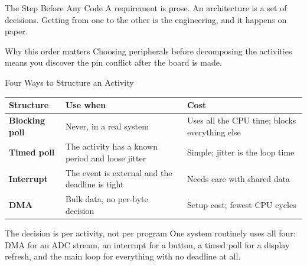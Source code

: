 \documentclass[9pt,aspectratio=169,xcolor=table]{beamer}
\begin{document}
\begin{frame}{The Step Before Any Code}
    \leavevmode
    A requirement is prose. An architecture is a set of decisions. Getting from
    one to the other is \alert{the engineering}, and it happens on paper.

    \vspace{3mm}
    \begin{center}
    \end{center}

    \vspace{2mm}
    \begin{block}{Why this order matters}
        Choosing peripherals before decomposing the activities means you discover
        the pin conflict \alert{after} the board is made.
    \end{block}
\end{frame}

\begin{frame}{Four Ways to Structure an Activity}
    \begin{center}
    {\small
    \striped
    \begin{tabular}{@{}l R{.34\textwidth} R{.32\textwidth}@{}}
        \toprule
        \textbf{Structure} & \textbf{Use when} & \textbf{Cost} \\
        \midrule
        \textbf{Blocking poll} & Never, in a real system & Uses all the CPU time; blocks everything else \\
        \textbf{Timed poll} & The activity has a known period and loose jitter & Simple; jitter is the loop time \\
        \textbf{Interrupt} & The event is external and the deadline is tight & Needs care with shared data \\
        \textbf{DMA} & Bulk data, no per-byte decision & Setup cost; fewest CPU cycles \\
        \bottomrule
    \end{tabular}}
    \end{center}

    \vspace{3mm}
    \begin{block}{The decision is per activity, not per program}
        One system routinely uses all four: DMA for an ADC stream, an interrupt
        for a button, a timed poll for a display refresh, and the main loop for
        everything with no deadline at all.
    \end{block}
\end{frame}
\end{document}
